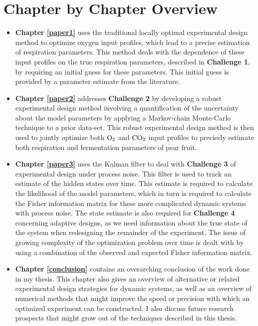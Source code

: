 \section{Chapter by Chapter Overview}
\begin{itemize}
	\item \textbf{Chapter \ref{paper1}} uses the traditional locally optimal experimental design method to optimize oxygen input profiles, which lead to a precise estimation of respiration parameters. This method deals with the dependence of these input profiles on the true respiration parameters, described in \textbf{Challenge 1}, by requiring an initial guess for these parameters. This initial guess is provided by a parameter estimate from the literature.
	\item \textbf{Chapter \ref{paper2}} addresses \textbf{Challenge 2} by developing a robust experimental design method involving a quantification of the uncertainty about the model parameters by applying a Markov-chain Monte-Carlo technique to a prior data-set. This robust experimental design method is then used to jointly optimize both  $\text{O}_2$ and $\text{CO}_2$ input profiles to precisely estimate both respiration and fermentation parameters of pear fruit.
	\item \textbf{Chapter \ref{paper3}} uses the Kalman filter to deal with \textbf{Challenge 3} of experimental design under process noise. This filter is used to track an estimate of the hidden states over time. This estimate is required to calculate the likelihood of the model parameters, which in turn is required to calculate the Fisher information matrix for these more complicated dynamic systems with process noise. The state estimate is also required for \textbf{Challenge 4} concerning adaptive designs, as we need information about the true state of the system when redesigning the remainder of the experiment. The issue of growing complexity of the optimization problem over time is dealt with by using a combination of the observed and expected Fisher information matrix.
	\item \textbf{Chapter \ref{conclusion}} contains an overarching conclusion of the work done in my thesis. This chapter also gives an overview of alternative or related experimental design strategies for dynamic systems, as well as an overview of numerical methods that might improve the speed or precision with which an optimized experiment can be constructed. I also discuss future research prospects that might grow out of the techniques described in this thesis.
\end{itemize}
